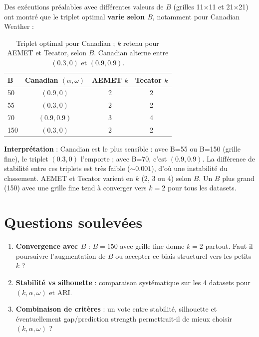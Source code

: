 \documentclass[11pt, a4paper]{article}
\begin{document}
Des exécutions préalables avec différentes valeurs de $B$ (grilles 11$\times$11
et 21$\times$21) ont montré que le triplet optimal \textbf{varie selon $B$},
notamment pour Canadian Weather :

\begin{table}[H]
\centering
\scriptsize
\begin{tabular}{lccc}
\toprule
\textbf{B} & \textbf{Canadian} $(\alpha, \omega)$ & \textbf{AEMET} $k$ &
\textbf{Tecator} $k$ \\
\midrule
50  & $(0.9, 0)$   & 2 & 2 \\
55  & $(0.3, 0)$   & 2 & 2 \\
70  & $(0.9, 0.9)$ & 3 & 4 \\
150 & $(0.3, 0)$   & 2 & 2 \\
\bottomrule
\end{tabular}
\caption{Triplet optimal pour Canadian ; $k$ retenu pour AEMET et Tecator,
selon $B$. Canadian alterne entre $(0.3, 0)$ et $(0.9, 0.9)$.}
\label{tab:sensibilite-B}
\end{table}

\textbf{Interprétation} : Canadian est le plus sensible : avec B=55 ou B=150
(grille fine), le triplet $(0.3, 0)$ l'emporte ; avec B=70, c'est $(0.9, 0.9)$.
La différence de stabilité entre ces triplets est très faible ($\sim 0.001$),
d'où une instabilité du classement. AEMET et Tecator varient en $k$ (2, 3 ou 4)
selon $B$. Un $B$ plus grand (150) avec une grille fine tend à converger vers
$k=2$ pour tous les datasets.

\section{Questions soulevées}

\begin{enumerate}
  \item \textbf{Convergence avec $B$} : $B = 150$ avec grille fine donne
        $k = 2$ partout. Faut-il poursuivre l'augmentation de $B$ ou accepter
        ce biais structurel vers les petits $k$ ?
  \item \textbf{Stabilité vs silhouette} : comparaison systématique sur les 4
        datasets pour $(k, \alpha, \omega)$ et ARI.
  \item \textbf{Combinaison de critères} : un vote entre stabilité,
        silhouette et éventuellement gap/prediction strength permettrait-il
        de mieux choisir $(k, \alpha, \omega)$ ?
\end{enumerate}
\end{document}
